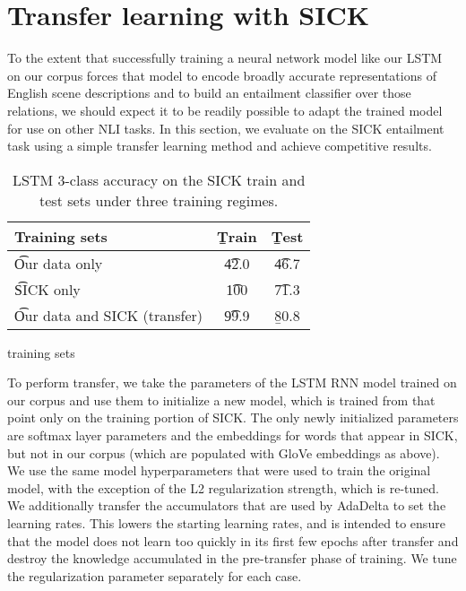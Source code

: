 \section{Transfer learning with SICK}

To the extent that successfully training a neural network model like our LSTM on our corpus forces that model to encode broadly accurate representations of English scene descriptions and to build an entailment classifier over those relations, we should expect it to be readily possible to adapt the trained model for use on other NLI tasks. In this section, we evaluate on the SICK entailment task using a simple transfer learning method and achieve competitive results.

\begin{table}
\begin{center}
\begin{tabular}{l@{\hskip \colspaceL}@{\hskip \colspaceL}c@{\hskip \colspaceL}c}
\toprule
\textbf{Training sets} & \b{Train}  & \b{Test}\\
\midrule
\t{Our data only}            & \t{42.0} & \t{46.7} \\
\t{SICK only}            & \t{100} & \t{71.3} \\
\t{Our data and SICK (transfer)}            & \t{99.9} & \b{80.8} \\
\bottomrule
\end{tabular}
\end{center}

training sets

\caption{\label{tab:transferresults}
LSTM 3-class accuracy on the SICK train and test sets under three training regimes.} 
\end{table}


To perform transfer, we take the parameters of the LSTM RNN model trained on our corpus and use them to initialize a new model, which is trained from that point only on the training portion of SICK. The only newly initialized parameters are softmax layer parameters and the embeddings for words that appear in SICK, but not in our corpus (which are populated with GloVe embeddings as above). We use the same model hyperparameters that were used to train the original model, with the exception of the L2 regularization strength, which is re-tuned. We additionally transfer the accumulators that are used by AdaDelta to set the learning rates. This lowers the starting learning rates, and is intended to ensure that the model does not learn too quickly in its first few epochs after transfer and destroy the knowledge accumulated in the pre-transfer phase of training. We tune the regularization parameter separately for each case. 

